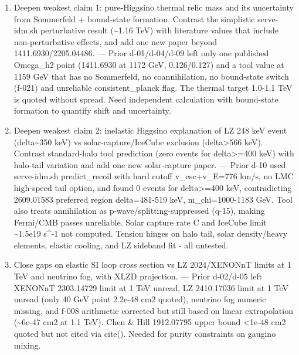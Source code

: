 \documentclass[11pt,a4paper]{article}
\begin{document}
\begin{enumerate}
  \item Deepen weakest claim 1: pure-Higgsino thermal relic mass and its uncertainty from Sommerfeld + bound-state formation. Contrast the simplistic serve-idm.sh perturbative result (\textasciitilde{}1.16 TeV) with literature values that include non-perturbative effects, and add one new paper beyond 1411.6930/2205.04486. --- Prior d-01/d-04/d-09 left only one published Omega\_h2 point (1411.6930 at 1172 GeV, 0.126/0.127) and a tool value at 1159 GeV that has no Sommerfeld, no coannihilation, no bound-state switch (f-021) and unreliable consistent\_planck flag. The thermal target 1.0-1.1 TeV is quoted without spread. Need independent calculation with bound-state formation to quantify shift and uncertainty.
  \item Deepen weakest claim 2: inelastic Higgsino explanation of LZ 248 keV event (delta\textasciitilde{}350 keV) vs solar-capture/IceCube exclusion (delta\textgreater{}566 keV). Contrast standard-halo tool prediction (zero events for delta\textgreater{}=400 keV) with halo-tail variation and add one new solar-capture paper. --- Prior d-10 used serve-idm.sh predict\_recoil with hard cutoff v\_esc+v\_E=776 km/s, no LMC high-speed tail option, and found 0 events for delta\textgreater{}=400 keV, contradicting 2609.01583 preferred region delta=481-519 keV, m\_chi=1000-1183 GeV. Tool also treats annihilation as p-wave/splitting-suppressed (q-15), making Fermi/CMB passes unreliable. Solar capture rate C and IceCube limit \textasciitilde{}1.5e19 s\textasciicircum{}-1 not computed. Tension hinges on halo tail, solar density/heavy elements, elastic cooling, and LZ sideband fit - all untested.
  \item Close gaps on elastic SI loop cross section vs LZ 2024/XENONnT limits at 1 TeV and neutrino fog, with XLZD projection. --- Prior d-02/d-05 left XENONnT 2303.14729 limit at 1 TeV unread, LZ 2410.17036 limit at 1 TeV unread (only 40 GeV point 2.2e-48 cm2 quoted), neutrino fog numeric missing, and f-008 arithmetic corrected but still based on linear extrapolation (\textasciitilde{}6e-47 cm2 at 1.1 TeV). Chen \& Hill 1912.07795 upper bound \textless{}1e-48 cm2 quoted but not cited via cite(). Needed for purity constraints on gaugino mixing.

\end{enumerate}
\end{document}
